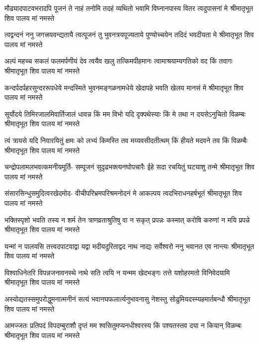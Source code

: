 \fourlineindentedshloka
{मौढ्यादपाटवभरादपि पूजनं ते}
{नाहं तनोमि तदहं व्यथितो भवामि}
{विघ्नानपास्य वितर त्वदुपासनां मे}
{श्रीमातृभूत शिव पालय मां नमस्ते} %

\fourlineindentedshloka
{त्वद्वन्दनं ननु जगत्त्रयवन्द्यतायै}
{त्वत्पूजनं तु भुवनत्रयपूज्यताये}
{पुण्योच्चयेन तदिदं भवदीयता मे}
{श्रीमातृभूत शिव पालय मां नमस्ते} %

\fourlineindentedshloka
{अल्पं महच्च सकलं फलमर्पणीयं}
{देव त्वयैव खलु तत्किमपीहमानः}
{त्वामाश्रयाम्यगतिको वद किं तवागः}
{श्रीमातृभूत शिव पालय मां नमस्ते} %

\fourlineindentedshloka
{कन्दर्पदर्पहरसुन्दररूपधेये}
{मन्दस्मिते भुवनमङ्गळनामधेये}
{खेदापहे भवति खेलय मानसं मे}
{श्रीमातृभूत शिव पालय मां नमस्ते} %

\fourlineindentedshloka
{सूर्योदये तिमिरजालमिवार्तिजालं}
{धावन्न किं मम विभो यदि दृक्पथेस्याः}
{किं मे तथा न दयसेऽनुचितो विळम्बः}
{श्रीमातृभूत शिव पालय मां नमस्ते} %

\fourlineindentedshloka
{त्वं त्रायसे यदि निवारयितुं क्षमः को}
{लभ्यं किमस्ति तव मय्यवसीदतीत्थम्}
{किं हीयते मदवने तव किं विळम्बैः}
{श्रीमातृभूत शिव पालय मां नमस्ते} %

\fourlineindentedshloka
{चन्द्रोपलामलभवत्कमनीयमूर्ति-}
{सम्पूजनं सुदृढभक्त्यनघोपचारैः}
{ईहे सदा रचयितुं घटयाशु तन्मे}
{श्रीमातृभूत शिव पालय मां नमस्ते} %

\fourlineindentedshloka
{संसारसिन्धुसमुदित्वरखेदमोद-}
{वीचीपरिभ्रमपरिश्रमनोदनं मे}
{आकल्पय त्वदभिराधनहर्षभूतं}
{श्रीमातृभूत शिव पालय मां नमस्ते} %

\fourlineindentedshloka
{भक्तिस्पृशो भवति तस्य न शर्म तेन}
{त्राणव्रताश्रुतिषु वा न सकृत् प्रपन्नः}
{कस्मात् करोषि करुणां न मयि प्रपन्ने}
{श्रीमातृभूत शिव पालय मां नमस्ते} %

\fourlineindentedshloka
{यन्मां न पालयसि तत्त्वदपाटवाद्वा}
{यद्वा मदीयदुरिताद्वद नाथ नाद्यः}
{सर्वेश्वरो ननु भवानत एव नान्त्यः}
{श्रीमातृभूत शिव पालय मां नमस्ते} %

\fourlineindentedshloka
{विश्वाधिनेतरि विपन्नजनावनस्थे}
{नाथे सति त्वयि न यन्मम खेदभङ्गः}
{तत्ते यशोहरमतो विनिवेदयामि}
{श्रीमातृभूत शिव पालय मां नमस्ते} %

\fourlineindentedshloka
{अस्योद्यतस्समुपरोद्धुमनात्मनीनं}
{सत्यं भवानघफलार्त्यनुभावनासु}
{नेशस्तु सोढुमियदस्म्यहमार्तबन्धौ}
{श्रीमातृभूत शिव पालय मां नमस्ते} %

\fourlineindentedshloka
{आमज्जतः प्रतिपदं विपदम्बुराशौ}
{दृप्तं मम श्वसितुमप्यनधीश्वरस्य}
{किं पश्यतस्तव दया न कियान् विळम्बः}
{श्रीमातृभूत शिव पालय मां नमस्ते} %

